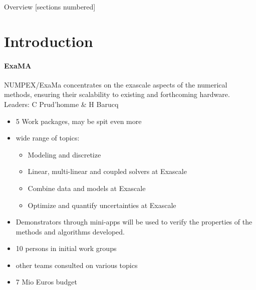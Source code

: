 \titleframe

\begin{frame}{Overview}
  [sections numbered]
  \tableofcontents[hideallsubsections]
\end{frame}


\section{Introduction}
\begin{frame}{\insertsectionhead}
  \framesubtitle{ExaMA}
  NUMPEX/ExaMa concentrates on the exascale aspects of the numerical methods, ensuring their scalability to existing and forthcoming hardware.
  \vfill
  Leaders: C Prud'homme \& H Barucq
  \begin{itemize}
    \item 5 Work packages, may be spit even more
    \item wide range of topics: 
    \begin{itemize}
        \item Modeling and discretize
        \item  Linear, multi-linear and coupled solvers at Exascale
        \item Combine data and  models at Exascale
        \item Optimize and quantify uncertainties at Exascale
    \end{itemize}
    \item Demonstrators through mini-apps will be used to verify the properties of the methods and algorithms developed.
    
  \end{itemize}
\end{frame}
\begin{frame}{\insertsectionhead}
    
   \begin{itemize}
    \item 10 persons in initial work groups
    \item other teams consulted on various topics 
    \item 7 Mio Euros budget
\end{itemize} 
\end{frame}

